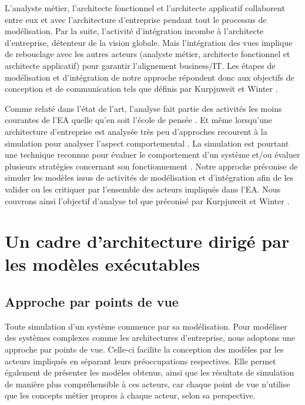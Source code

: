 L'analyste métier, l'architecte fonctionnel et l'architecte applicatif collaborent entre eux et avec l'architecture d'entreprise pendant tout le processus de modélisation. Par la suite, l'activité d'intégration incombe à l'architecte d'entreprise, détenteur de la vision globale. Mais l'intégration des vues implique de rebouclage avec les autres acteurs (analyste métier, architecte fonctionnel et architecte applicatif) pour garantir l'alignement business/IT. Les étapes de modélisation et d'intégration de notre approche répondent donc aux objectifs de conception et de communication tels que définis par Kurpjuweit et Winter \cite{kurpjuweit2007viewpoint}.

Comme relaté dans l'état de l'art, l'analyse fait partie des activités les moins courantes de l'EA quelle qu'en soit l'école de pensée \cite{chen2008architectures} \cite{barn2013enterprise}. Et même lorsqu'une architecture d'entreprise est analysée très peu d'approches recourent à la simulation pour analyser l'aspect comportemental \cite{glazner2011enterprise} \cite{manzur2015xarchimate}. La simulation est pourtant une technique reconnue pour évaluer le comportement d'un système et/ou évaluer plusieurs stratégies concernant son fonctionnement \cite{shannon1975systems}. Notre approche préconise de simuler les modèles issus de activités de modélisation et d'intégration afin de les valider ou les critiquer par l'ensemble des acteurs impliqués dans l'EA. Nous couvrons ainsi l'objectif d'analyse tel que préconisé par Kurpjuweit et Winter \cite{kurpjuweit2007viewpoint}. 



\section{Un cadre d'architecture dirigé par les modèles exécutables}

\subsection{Approche par points de vue}

Toute simulation d'un système commence par sa modélisation. Pour modéliser des systèmes complexes comme les architectures d'entreprise, nous adoptons une approche par points de vue. Celle-ci facilite la conception des modèles par les acteurs impliqués en séparant leurs préoccupations respectives. Elle permet également de présenter les modèles obtenus, ainsi que les résultats de simulation de manière plus compréhensible à ces acteurs, car chaque point de vue n'utilise que les concepts métier propres à chaque acteur, selon sa perspective. 

